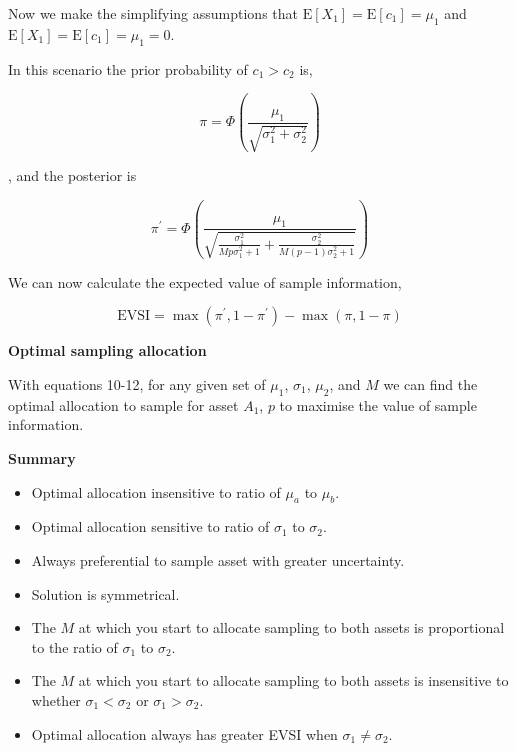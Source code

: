 \documentclass[]{article}
\providecommand{\tightlist}{%
  \setlength{\itemsep}{0pt}\setlength{\parskip}{0pt}}
\theoremstyle{definition}
\theoremstyle{definition}
\theoremstyle{remark}
\begin{document}
Now we make the simplifying assumptions that
\(\mathrm{E}[X_1]=\mathrm{E}[c_1]=\mu_1\) and
\(\mathrm{E}[X_1]=\mathrm{E}[c_1]=\mu_1=0\).

In this scenario the prior probability of \(c_1>c_2\) is,

\begin{equation}
\pi=\Phi\left(\frac{\mu_1}{\sqrt{\sigma^2_1+\sigma^2_2}}\right)
\label{eq:priorpi}
\end{equation}

, and the posterior is

\begin{equation}
\pi^\prime=\Phi\left(\frac{\mu_1}{\sqrt{\frac{\sigma^2_1}{Mp\sigma^2_1 + 1}+\frac{\sigma^2_2}{M(p-1)\sigma^2_2 + 1}}}\right)
\label{eq:posteriorpi}
\end{equation}

We can now calculate the expected value of sample information,

\begin{equation}
\mathrm{EVSI}=\max(\pi^{\prime}, 1-\pi^{\prime})-\max(\pi, 1-\pi)
\label{eq:evsiaucapen}
\end{equation}

\textbf{Optimal sampling allocation}

With equations 10-12, for any given set of \(\mu_1\), \(\sigma_1\),
\(\mu_2\), and \(M\) we can find the optimal allocation to sample for
asset \(A_1\), \(p\) to maximise the value of sample information.

\textbf{Summary}

\begin{itemize}
\tightlist
\item
  Optimal allocation insensitive to ratio of \(\mu_a\) to \(\mu_b\).
\item
  Optimal allocation sensitive to ratio of \(\sigma_1\) to \(\sigma_2\).
\item
  Always preferential to sample asset with greater uncertainty.
\item
  Solution is symmetrical.
\item
  The \(M\) at which you start to allocate sampling to both assets is
  proportional to the ratio of \(\sigma_1\) to \(\sigma_2\).
\item
  The \(M\) at which you start to allocate sampling to both assets is
  insensitive to whether \(\sigma_1 < \sigma_2\) or
  \(\sigma_1 > \sigma_2\).
\item
  Optimal allocation always has greater EVSI when
  \(\sigma_1 \neq \sigma_2\).
\end{itemize}
\end{document}
